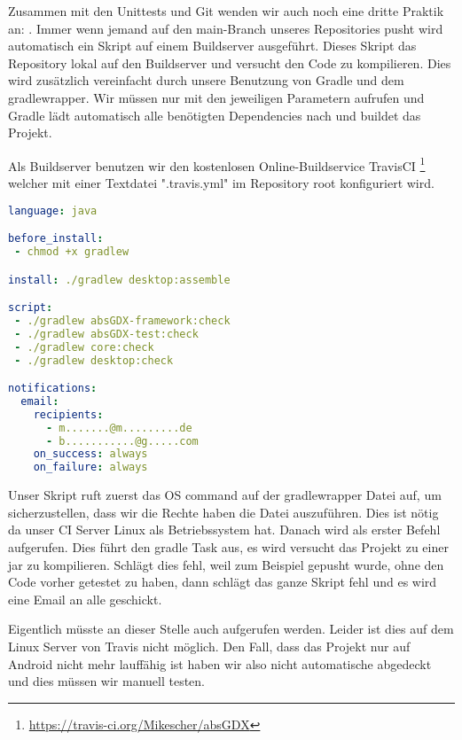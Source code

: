 Zusammen mit den Unittests und Git wenden wir auch noch eine dritte Praktik an: .
Immer wenn jemand auf den main-Branch unseres Repositories pusht wird automatisch ein Skript auf einem Buildserver ausgeführt.
Dieses Skript  das Repository lokal auf den Buildserver und versucht den Code zu kompilieren. Dies wird zusätzlich vereinfacht durch unsere Benutzung von Gradle und dem gradlewrapper. Wir müssen nur  mit den jeweiligen Parametern aufrufen und Gradle lädt automatisch alle benötigten Dependencies nach und buildet das Projekt.

Als Buildserver benutzen wir den kostenlosen Online-Buildservice TravisCI \footnote{\url{https://travis-ci.org/Mikescher/absGDX}} welcher mit einer Textdatei ".travis.yml" im Repository root konfiguriert wird.

\begin{lstlisting}[caption=TravisCI Konfiguration, title=\hspace{0 pt}, language=yaml]
language: java

before_install:
 - chmod +x gradlew

install: ./gradlew desktop:assemble

script: 
 - ./gradlew absGDX-framework:check
 - ./gradlew absGDX-test:check
 - ./gradlew core:check
 - ./gradlew desktop:check

notifications:
  email:
    recipients:
      - m.......@m.........de
      - b...........@g.....com
    on_success: always
    on_failure: always
\end{lstlisting}

Unser Skript ruft zuerst das OS command  auf der gradlewrapper Datei auf, um sicherzustellen, dass wir die Rechte haben die Datei auszuführen. Dies ist nötig da unser CI Server Linux als Betriebssystem hat.
Danach wird als erster Befehl  aufgerufen. Dies führt den gradle Task  aus, es wird versucht das Projekt zu einer jar zu kompilieren. Schlägt dies fehl, weil zum Beispiel gepusht wurde, ohne den Code vorher getestet zu haben, dann schlägt das ganze Skript fehl und es wird eine Email an alle  geschickt.

Eigentlich müsste an dieser Stelle auch  aufgerufen werden. Leider ist dies auf dem Linux Server von Travis nicht möglich. Den Fall, dass das Projekt nur auf Android nicht mehr lauffähig ist haben wir also nicht automatische abgedeckt und dies müssen wir manuell testen.

